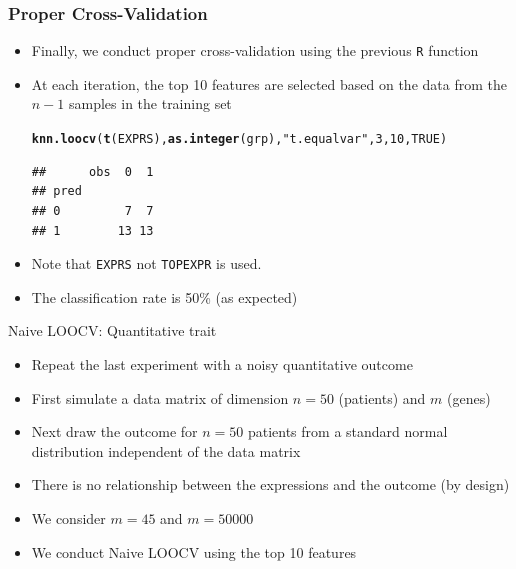 \documentclass[xcolor=x11names,compress]{beamer}\usepackage[]{graphicx}\usepackage[]{color}
\makeatletter
\newcommand{\hlnum}[1]{\textcolor[rgb]{0.686,0.059,0.569}{#1}}%
\newcommand{\hlstr}[1]{\textcolor[rgb]{0.192,0.494,0.8}{#1}}%
\newcommand{\hlstd}[1]{\textcolor[rgb]{0.345,0.345,0.345}{#1}}%
\newcommand{\hlkwd}[1]{\textcolor[rgb]{0.737,0.353,0.396}{\textbf{#1}}}%
\newenvironment{kframe}{%
 \def\at@end@of@kframe{}%
 \ifinner\ifhmode%
  \def\at@end@of@kframe{\end{minipage}}%
  \begin{minipage}{\columnwidth}%
 \fi\fi%
 \def\FrameCommand##1{\hskip\@totalleftmargin \hskip-\fboxsep
 \colorbox{shadecolor}{##1}\hskip-\fboxsep
     \hskip-\linewidth \hskip-\@totalleftmargin \hskip\columnwidth}%
 \MakeFramed {\advance\hsize-\width
   \@totalleftmargin\z@ \linewidth\hsize
   \@setminipage}}%
 {\par\unskip\endMakeFramed%
 \at@end@of@kframe}
\newenvironment{knitrout}{}{} %
\makeatother
\begin{document}
\begin{frame}[containsverbatim]
  \frametitle{Proper Cross-Validation}
  \footnotesize
  \begin{itemize}
  \item Finally, we conduct proper cross-validation using the 
        previous {\tt R} function
  \item At each iteration, the top 10 features are selected
        based on the data from the $n-1$ samples in the training set
\begin{knitrout}\tiny
{}\color{fgcolor}\begin{kframe}
\begin{alltt}
\hlkwd{knn.loocv}\hlstd{(}\hlkwd{t}\hlstd{(EXPRS),}\hlkwd{as.integer}\hlstd{(grp),}\hlstr{"t.equalvar"}\hlstd{,}\hlnum{3}\hlstd{,}\hlnum{10}\hlstd{,}\hlnum{TRUE}\hlstd{)}
\end{alltt}
\begin{verbatim}
##      obs  0  1
## pred          
## 0         7  7
## 1        13 13
\end{verbatim}
\end{kframe}
\end{knitrout}
\item Note that {\tt EXPRS} not {\tt TOPEXPR} is used.
\item The classification rate is 50\% (as expected)
\end{itemize}
  
\end{frame}


\begin{frame}{Naive LOOCV: Quantitative trait}
  \begin{itemize}
  \item Repeat the last experiment with a noisy quantitative outcome
  \item First simulate a data matrix of dimension $n=50$ (patients) and $m$ (genes)
  \item Next draw the outcome for $n=50$ patients from a standard
        normal distribution independent of the data matrix
  \item There is no relationship between the expressions and the outcome (by design)
  \item We consider $m=45$ and $m=50000$
  \item We conduct Naive LOOCV using the top 10 features 
  \end{itemize}
\end{frame}
\end{document}
